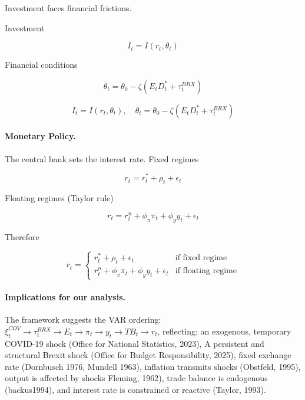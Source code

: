 \documentclass[
]{article}
\begin{document}
	Investment faces financial frictions.
	
	Investment
	
	\begin{equation*}
		I_t = I(r_t, \theta_t)
	\end{equation*}
	
	Financial conditions
	
	\begin{equation*}
		\theta_t = \theta_0 - \zeta (E_t D_t^* + \tau_t^{BRX})
	\end{equation*}
	
	\begin{equation}
		I_t = I(r_t, \theta_t), \quad \theta_t = \theta_0 - \zeta (E_t D_t^* + \tau_t^{BRX})
		\label{eq:bs}
	\end{equation}
	
	\paragraph*{Monetary Policy.}
	
	The central bank sets the interest rate. Fixed regimes
	
	\begin{equation*}
		r_t = r_t^* + \rho_t + \epsilon_t
	\end{equation*}
	
	Floating regimes (Taylor rule)
	
	\begin{equation*}
		r_t = r_t^n + \phi_\pi \pi_t + \phi_y y_t + \epsilon_t
	\end{equation*}
	
	Therefore 
	
	\begin{equation}
		r_t =
		\begin{cases} 
			r_t^* + \rho_t + \epsilon_t & \text{if fixed regime} \\
			r_t^n + \phi_\pi \pi_t + \phi_y y_t + \epsilon_t & \text{if floating regime}
		\end{cases}
		\label{eq:taylor}
	\end{equation}
	
	\paragraph*{Implications for our analysis.} 
	The framework suggests the VAR ordering: 
	\( \xi_t^{COV} \rightarrow \tau_t^{BRX} \rightarrow E_t \rightarrow \pi_t \rightarrow y_t \rightarrow TB_t \rightarrow r_t \), reflecting:
	an exogenous, temporary COVID-19 shock (Office for National Statistics, 2023), A 
	persistent and structural Brexit shock (Office for Budget Responsibility, 2025), fixed exchange rate (Dornbusch 1976, Mundell 1963),
	 inflation transmits shocks (Obstfeld, 1995), output is affected by shocks Fleming, 1962), trade balance is endogenous (backus1994),
	and interest rate is constrained or reactive (Taylor, 1993).
	
	
	
\end{document}
